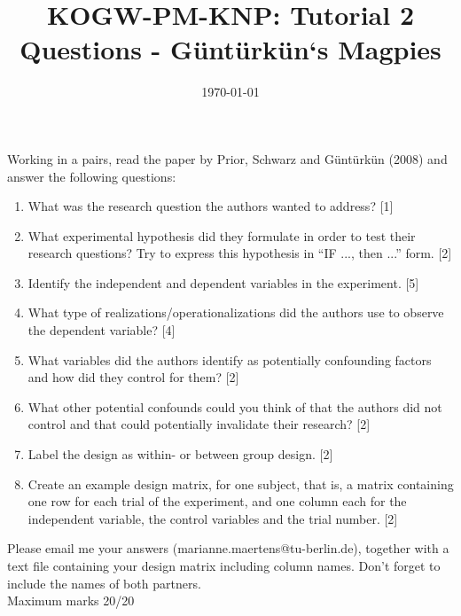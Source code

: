 \documentclass[12pt,english]{scrartcl}
\title{KOGW-PM-KNP: Tutorial 2 Questions - G{\"u}nt{\"u}rk{\"u}n`s Magpies}
\author{}
\date{\today}
\begin{document}
\maketitle

Working in a pairs, read the paper by Prior, Schwarz and G{\"u}nt{\"u}rk{\"u}n (2008) and answer the following questions:
\begin{enumerate}
 \item What was the research question the authors wanted to address? [1]
 \item What experimental hypothesis did they formulate in order to test their research questions? Try to express this hypothesis in ``IF ..., then ...'' form. [2]
 \item Identify the independent and dependent variables in the experiment. [5]
 \item What type of realizations/operationalizations did the authors use to observe the dependent variable? [4]
 \item What variables did the authors identify as potentially confounding factors and how did they control for them? [2]
 \item What other potential confounds could you think of that the authors did not control and that could potentially invalidate their research? [2]
 \item Label the design as within- or between group design. [2]
 \item Create an example design matrix, for one subject, that is, a matrix containing one row for each trial of the experiment, and one column each for the independent variable, the control variables and the trial number. [2]
 \end{enumerate}


Please email me your answers (marianne.maertens@tu-berlin.de), together with a text file containing your design matrix including column names. Don't forget to include the names of both partners. \\
Maximum marks 20/20
\end{document}
